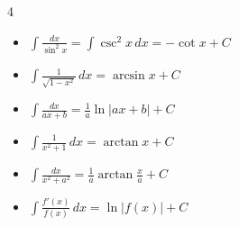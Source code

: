 \documentclass[10pt,a4paper]{article}
\begin{document}
\begin{multicols*}{4}
\begin{center}
\begin{small}
\begin{itemize}
			\item \begin{math}
				      \int \frac{dx}{\sin^2 x}=\int \csc^2 x \, dx = -\cot x + C
			      \end{math}
			\item \begin{math}
				      \int {\frac{1}{\sqrt{1-x^2}}} \, dx = \arcsin {x} + C
			      \end{math}
			\item \begin{math}
				      \int \frac{dx}{ax + b} = \frac{1}{a} \ln |ax + b| + C
			      \end{math}
			\item \begin{math}
				      \int \frac{1}{x^2 + 1} \, dx = \arctan x + C
			      \end{math}
			\item \begin{math}
				      \int \frac{dx}{x^2 + a^2} = \frac{1}{a} \arctan \frac{x}{a} + C
			      \end{math}
			\item \begin{math}
				      \int \frac{f'(x)}{f(x)} \, dx = \ln|f(x)| + C
			      \end{math}
		\end{itemize}
	\end{small}
\end{center}


\end{multicols*}
\end{document}
